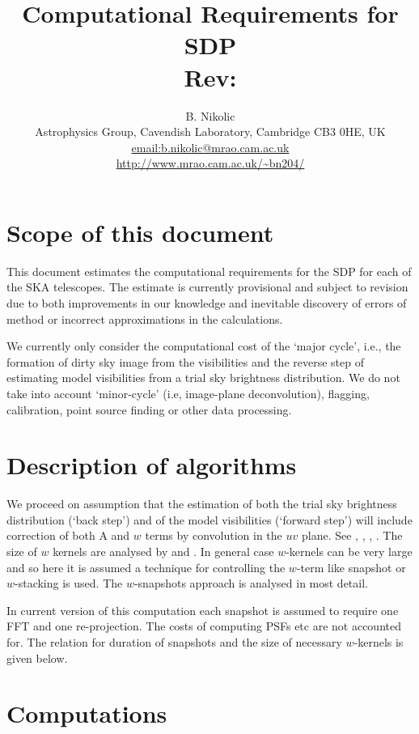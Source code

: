 \documentclass[useAMS,usenatbib,referee]{article}
\title{Computational Requirements for SDP\\
  Rev: }
\author{B. Nikolic\\
  Astrophysics Group, Cavendish Laboratory, Cambridge CB3 0HE, UK
  \\\url{email:b.nikolic@mrao.cam.ac.uk}
 \\\url{http://www.mrao.cam.ac.uk/~bn204/}}
\begin{document}
\maketitle
\makenomenclature

\tableofcontents

\section{Scope of this document}

This document estimates the computational requirements for the SDP for
each of the SKA telescopes.  The estimate is currently provisional and
subject to revision due to both improvements in our knowledge and
inevitable discovery of errors of method or incorrect approximations
in the calculations.

We currently only consider the computational cost of the `major
cycle', i.e., the formation of dirty sky image from the visibilities
and the reverse step of estimating model visibilities from a trial sky
brightness distribution. We do not take into account `minor-cycle'
(i.e, image-plane deconvolution), flagging, calibration, point source
finding or other data processing.

\section{Description of algorithms}

We proceed on assumption that the estimation of both the trial sky
brightness distribution (`back step') and of the model visibilities
(`forward step') will include correction of both A and $w$ terms by
convolution in the $uv$ plane. See \cite{Cornwell2008-4703511},
\cite{Hymphreys132}, \cite{2012SPIE.8500E..0LC},
\cite{2008A&A...487..419B}. The size of $w$ kernels are analysed by
\cite{Hymphreys132} and \cite{Mitchell2014}. In general case
$w$-kernels can be very large and so here it is assumed a technique
for controlling the $w$-term like snapshot or $w$-stacking is
used. The $w$-snapshots approach is analysed in most detail. 

In current version of this computation each snapshot is assumed to
require one FFT and one re-projection. The costs of computing PSFs etc
are not accounted for. The relation for duration of snapshots and the
size of necessary $w$-kernels is given below.


\section{Computations}
\end{document}
